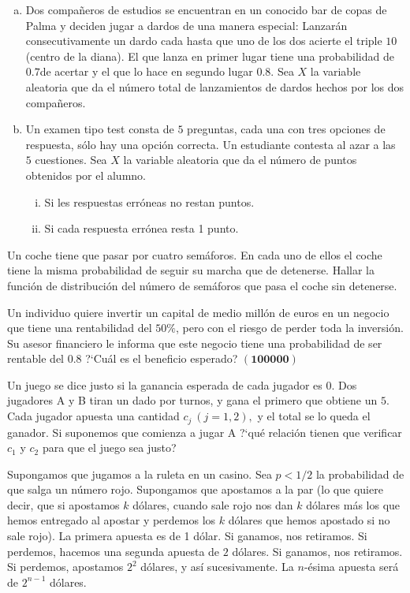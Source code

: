 \documentclass[12pt]{article}
\begin{document}
\begin{enumerate}[a)]
\item  Dos compañeros de estudios  se encuentran en un conocido bar de copas de Palma
y deciden jugar a dardos de una manera especial: Lanzarán consecutivamente un dardo cada
hasta que uno de los dos acierte el triple $10$ (centro de la diana).  El que lanza en
primer lugar tiene una probabilidad de $0.7$de acertar  y el que lo hace en segundo lugar
$0.8$. Sea $X$ la variable aleatoria que da el número total de lanzamientos de dardos
hechos por los dos compañeros.

\item  Un examen tipo test  consta de $5$ preguntas, cada una  con tres opciones de
respuesta, sólo hay una opción correcta. Un estudiante contesta al azar  a las $5$
cuestiones. Sea $X$ la variable aleatoria que da el número de puntos obtenidos por el
alumno.
\begin{enumerate}[i)]
\item Si les respuestas erróneas  no restan puntos.
\item Si cada respuesta errónea resta 1 punto.
\end{enumerate}
\end{enumerate}



\probl  Un coche tiene que  pasar por cuatro semáforos. En cada uno de ellos el coche tiene
la misma probabilidad de seguir su marcha que de detenerse. Hallar la función de
distribución del número de semáforos que pasa el coche sin detenerse.


\probl Un individuo quiere invertir un capital de medio millón de euros en un negocio que
tiene una rentabilidad del $50\%$, pero con el riesgo de perder toda la inversión. Su
asesor financiero le informa que este negocio tiene una probabilidad de ser rentable del
$0.8$ ?`Cuál es el beneficio esperado? $\mathbf{(100000)}$

\probl Un juego se dice justo si la ganancia esperada de cada jugador es $0$. Dos jugadores
A y  B tiran un dado por turnos, y gana el primero que obtiene un $5$. Cada jugador apuesta
una cantidad $ c_j \ (j=1,2),  $  y el total se lo queda el ganador. Si suponemos que
comienza  a jugar A ?`qué relación tienen que verificar $c_1$ y $c_2$ para que el juego sea
justo?


\probl  Supongamos que jugamos a la ruleta en un casino. Sea $p<1/2$ la probabilidad de que
salga un número rojo. Supongamos que apostamos a la par (lo que quiere decir, que si
apostamos $k$ dólares, cuando sale rojo nos dan $k$ dólares más los que hemos entregado al
apostar y perdemos los
 $k$ dólares que hemos apostado si no sale rojo). La primera apuesta es de 1 dólar. Si
ganamos, nos retiramos. Si perdemos, hacemos una segunda apuesta de $2$ dólares. Si
ganamos, nos retiramos. Si perdemos, apostamos $2^2$ dólares,  y así sucesivamente. La
$n$-ésima apuesta será de $2^{n-1}$ dólares.
\end{document}
